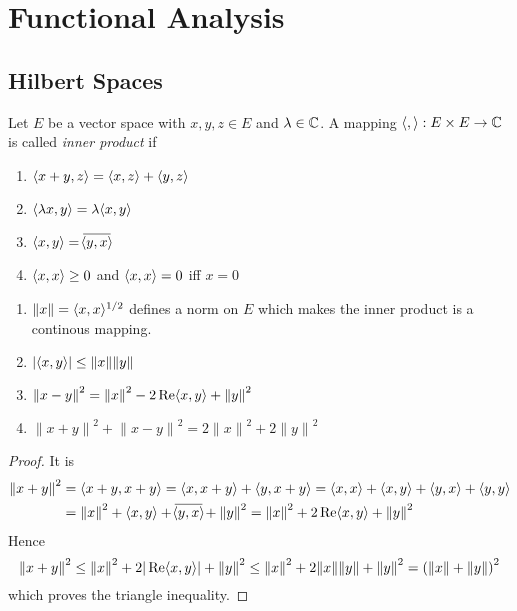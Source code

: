 \newpage
\section{Functional Analysis}

\subsection{Hilbert Spaces}
\bigskip

\begin{definition}
    Let \( E \) be a vector space with \( x, y, z \in E \) and \( \lambda \in \mathbb{C} \). A mapping
    \( \langle,\rangle: E\times E \to \mathbb{C} \) is called \emph{inner product} if
    \begin{enumerate}
        \item \( \langle x + y,z\rangle = \langle x,z\rangle + \langle y,z\rangle \)
        \item \( \langle\lambda x,y\rangle = \lambda \langle x,y\rangle\)
        \item \( \langle x,y\rangle = \overline{\!\langle y,x\rangle\!} \)
        \item \( \langle x,x\rangle \ge 0 \) and \( \langle x,x\rangle = 0 \) iff \( x = 0 \)
    \end{enumerate}
\end{definition}
\bigskip


\begin{lemma}
    \hfill
    \begin{enumerate}
        \item \( \|x\| = \langle x,x\rangle^{1/2} \) defines a norm on \( E \)
              which makes the inner product is a continous mapping.
        \item \( |\langle x,y\rangle| \le \|x\| \|y\| \)
        \item \( {\|x - y\|}^2 = {\|x\|}^2 - 2\operatorname{Re}\langle x,y\rangle + {\|y\|}^2 \)
        \item \( {\|x + y\|}^2 + {\|x - y\|}^2 = 2{\|x\|}^2 + 2{\|y\|}^2 \)
    \end{enumerate}
\end{lemma}
\begin{proof}
    It is
    \[
        \begin{split}
            {\|x + y\|}^2 & = \langle x + y,x + y\rangle  = \langle x,x + y\rangle + \langle y,x + y\rangle
            = \langle x,x\rangle + \langle x,y\rangle + \langle y,x\rangle + \langle y,y\rangle \\
            & = {\|x\|}^2 + \langle x,y\rangle + \overline{\!\langle y,x\rangle\!} + {\|y\|}^2
            = {\|x\|}^2 + 2\operatorname{Re}\langle x,y\rangle + {\|y\|}^2
        \end{split}
    \]
    Hence
    \[
        {\|x + y\|}^2 \le {\|x\|}^2 + 2|\operatorname{Re}\langle x,y\rangle| + {\|y\|}^2
        \le {\|x\|}^2 +  2\|x\| \|y\| + {\|y\|}^2 = {(\|x\| + \|y\|)}^2
    \]
    which proves the triangle inequality.
\end{proof}
\bigskip


